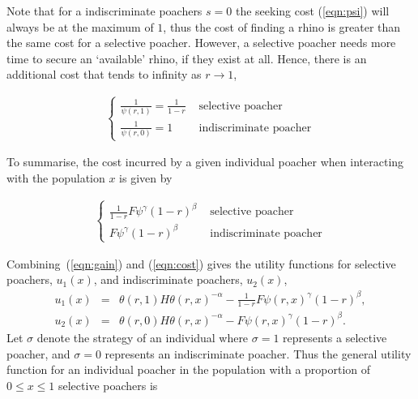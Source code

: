 \documentclass[10pt]{article}
\begin{document}
Note that for a indiscriminate poachers \(s = 0\) the seeking 
cost (\ref{eqn:psi}) will always be at the maximum of \(1\), thus the cost of finding a rhino is greater
than the same cost for a selective poacher. However, a selective poacher needs 
more time to secure an `available' rhino, if they exist at all. Hence, there is an 
additional cost that tends to infinity as \(r \rightarrow 1\), 

\begin{eqnarray}
    \label{eqn:selective_cost}
    \left\{
    \begin{array}{cl}
    \frac{1}{\psi(r, 1)} = \frac{1}{1 - r} & \mbox{ selective poacher}
    \\
    \frac{1}{\psi(r, 0)} = 1 & \mbox{ indiscriminate poacher}
    \end{array} \right.
\end{eqnarray}

To summarise, the cost incurred by a given individual poacher when interacting with
the population \(x\) is given by 

\begin{eqnarray}
    \label{eqn:cost}
    \left\{
    \begin{array}{cl}
    \frac{1}{1 - r}  F\psi^{\gamma} (1-r)^{\beta}& \mbox{ selective poacher}
    \\
    F\psi^{\gamma} (1-r)^{\beta}& \mbox{ indiscriminate poacher}
    \end{array} \right.
\end{eqnarray}

Combining~(\ref{eqn:gain}) and (\ref{eqn:cost}) gives the utility functions for 
selective poachers, \(u_1(x)\), and indiscriminate poachers, \(u_2(x)\), 
\begin{eqnarray} %
\label{eqn:USchi}
u_1(x) &=& \theta(r,1) H \theta(r,x)^{-\alpha}
- \frac{1}{1- r} F\psi(r, x)^{\gamma} (1-r)^{\beta} ,
\\
\label{eqn:UnotSchi}
u_2(x) &=& \theta(r,0) H \theta(r,x)^{-\alpha}
- F\psi(r, x)^{\gamma}  (1-r)^{\beta}.
\end{eqnarray}
Let \(\sigma\) denote the strategy of an individual where \(\sigma =1\) represents
a selective poacher, and \(\sigma=0\) represents an indiscriminate poacher.
Thus the general utility function for an individual poacher in the population with
a proportion of \(0 \leq x \leq 1\) selective poachers is
\end{document}
